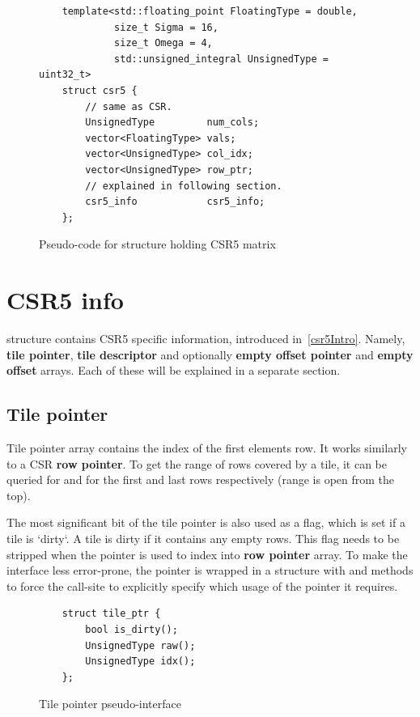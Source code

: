 \documentclass[thesis=M,english]{FITthesis}[2019/12/23]
\begin{document}
\begin{figure}[htp]
    \begin{verbatim}
    template<std::floating_point FloatingType = double,
             size_t Sigma = 16,
             size_t Omega = 4,
             std::unsigned_integral UnsignedType = uint32_t>
    struct csr5 {
        // same as CSR.
        UnsignedType         num_cols;
        vector<FloatingType> vals;
        vector<UnsignedType> col_idx;
        vector<UnsignedType> row_ptr;
        // explained in following section.
        csr5_info            csr5_info;
    };
    \end{verbatim}
    \caption{Pseudo-code for structure holding CSR5 matrix}
\end{figure}

\section{CSR5 info}

 structure contains CSR5 specific information, introduced in~\ref{csr5Intro}.
Namely, \textbf{tile pointer}, \textbf{tile descriptor} and optionally \textbf{empty offset pointer} and
\textbf{empty offset} arrays. Each of these will be explained in a separate section.

\subsection{Tile pointer}

Tile pointer array contains the index of the first elements row. It works similarly to a CSR
\textbf{row pointer}. To get the range of rows covered by a tile, it can be queried for 
and  for the first and last rows respectively (range is open from the top).

The most significant bit of the tile pointer is also used as a flag, which is set if a tile is `dirty`.
A tile is dirty if it contains any empty rows. This flag needs to be stripped when the pointer is used to
index into \textbf{row pointer} array. To make the interface less error-prone, the pointer is wrapped
in a structure with  and  methods to force the call-site to explicitly specify
which usage of the pointer it requires.

\begin{figure}[htp]
    \begin{verbatim}
    struct tile_ptr {
        bool is_dirty();
        UnsignedType raw(); 
        UnsignedType idx(); 
    };
    \end{verbatim}
    \caption{Tile pointer pseudo-interface}
\end{figure}
\end{document}
